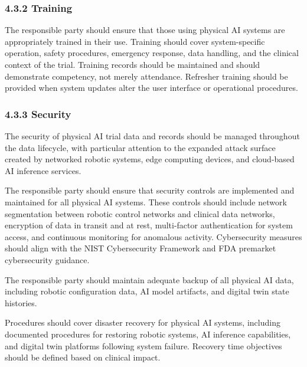 \documentclass[11pt]{article}
\begin{document}
\subsubsection{4.3.2 Training}

The responsible party should ensure that those using physical AI systems are appropriately trained in their use. Training should cover system-specific operation, safety procedures, emergency response, data handling, and the clinical context of the trial. Training records should be maintained and should demonstrate competency, not merely attendance. Refresher training should be provided when system updates alter the user interface or operational procedures.

\subsubsection{4.3.3 Security}

\begin{description}[leftmargin=2.5cm,style=sameline]

\item[(a)] The security of physical AI trial data and records should be managed throughout the data lifecycle, with particular attention to the expanded attack surface created by networked robotic systems, edge computing devices, and cloud-based AI inference services.

\item[(b)] The responsible party should ensure that security controls are implemented and maintained for all physical AI systems. These controls should include network segmentation between robotic control networks and clinical data networks, encryption of data in transit and at rest, multi-factor authentication for system access, and continuous monitoring for anomalous activity. Cybersecurity measures should align with the NIST Cybersecurity Framework and FDA premarket cybersecurity guidance.

\item[(c)] The responsible party should maintain adequate backup of all physical AI data, including robotic configuration data, AI model artifacts, and digital twin state histories.

\item[(d)] Procedures should cover disaster recovery for physical AI systems, including documented procedures for restoring robotic systems, AI inference capabilities, and digital twin platforms following system failure. Recovery time objectives should be defined based on clinical impact.

\end{description}
\end{document}
